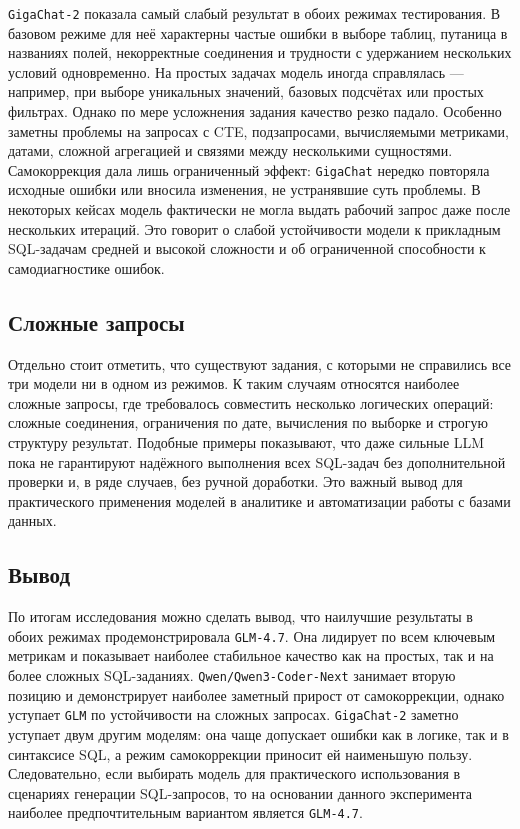 \texttt{GigaChat-2} показала самый слабый результат в обоих режимах тестирования.
В базовом режиме для неё характерны частые ошибки в выборе таблиц, путаница в
названиях полей, некорректные соединения и трудности с удержанием нескольких условий
одновременно. На простых задачах модель иногда справлялась — например, при выборе
уникальных значений, базовых подсчётах или простых фильтрах. Однако по мере
усложнения задания качество резко падало. Особенно заметны проблемы на запросах с
CTE, подзапросами, вычисляемыми метриками, датами, сложной агрегацией и связями
между несколькими сущностями. Самокоррекция дала лишь ограниченный эффект:
\texttt{GigaChat} нередко повторяла исходные ошибки или вносила изменения, не
устранявшие суть проблемы. В некоторых кейсах модель фактически не могла выдать
рабочий запрос даже после нескольких итераций. Это говорит о слабой устойчивости
модели к прикладным SQL-задачам средней и высокой сложности и об ограниченной
способности к самодиагностике ошибок.

\subsection{Сложные запросы}

Отдельно стоит отметить, что существуют задания, с которыми не справились все три
модели ни в одном из режимов. К таким случаям относятся наиболее сложные запросы,
где требовалось совместить несколько логических операций: сложные соединения,
ограничения по дате, вычисления по выборке и строгую структуру результат. Подобные
примеры показывают, что даже сильные LLM пока не гарантируют надёжного выполнения
всех SQL-задач без дополнительной проверки и, в ряде случаев, без ручной доработки.
Это важный вывод для практического применения моделей в аналитике и автоматизации
работы с базами данных.

\subsection{Вывод}

По итогам исследования можно сделать вывод, что наилучшие результаты в обоих
режимах продемонстрировала \texttt{GLM-4.7}. Она лидирует по всем ключевым метрикам
и показывает наиболее стабильное качество как на простых, так и на более сложных
SQL-заданиях. \texttt{Qwen/Qwen3-Coder-Next} занимает вторую позицию и демонстрирует
наиболее заметный прирост от самокоррекции, однако уступает \texttt{GLM} по
устойчивости на сложных запросах. \texttt{GigaChat-2} заметно уступает двум другим
моделям: она чаще допускает ошибки как в логике, так и в синтаксисе SQL, а режим
самокоррекции приносит ей наименьшую пользу. Следовательно, если выбирать модель для
практического использования в сценариях генерации SQL-запросов, то на основании
данного эксперимента наиболее предпочтительным вариантом является \texttt{GLM-4.7}.

